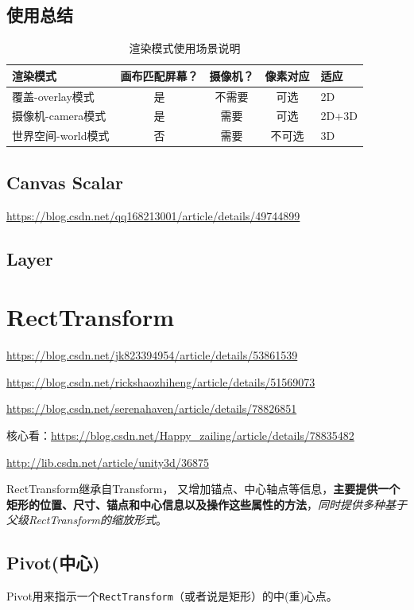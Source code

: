 \documentclass[UTF8,a4paper,12pt]{ctexbook}
\begin{document}
		\subsection{使用总结}
			\begin{table}[H]
				\centering
				\caption{渲染模式使用场景说明}
				\begin{tabular}{p{4cm}<{\centering}|c|c|c|p{3cm}<{\centering}}
					\toprule
						渲染模式 & 画布匹配屏幕？& 摄像机？ & 像素对应 & 适应\\
					\midrule
						覆盖-overlay模式 & 是	& 不需要	& 可选 & 2D \\
						摄像机-camera模式 & 是	& 需要	 & 可选 & 2D+3D\\
						世界空间-world模式 & 否	& 需要	 & 不可选 & 3D\\
					\bottomrule
				\end{tabular}
			\end{table}
		
		\subsection{Canvas Scalar}
			\url{https://blog.csdn.net/qq168213001/article/details/49744899}
		
		\subsection{Layer}
		
		
	\section{RectTransform}
		\url{https://blog.csdn.net/jk823394954/article/details/53861539}
	
		\url{https://blog.csdn.net/rickshaozhiheng/article/details/51569073}
		
		\url{https://blog.csdn.net/serenahaven/article/details/78826851}
		
		核心看：\url{https://blog.csdn.net/Happy_zailing/article/details/78835482}
		
		\url{http://lib.csdn.net/article/unity3d/36875}
		
		RectTransform继承自Transform， 又增加锚点、中心轴点等信息，\textbf{主要提供一个矩形的位置、尺寸、锚点和中心信息以及操作这些属性的方法}，\textit{同时提供多种基于父级RectTransform的缩放形式}。
		
		\subsection{Pivot(中心)}
			Pivot用来指示一个\verb|RectTransform|（或者说是矩形）的中(重)心点。	
	
\end{document}
